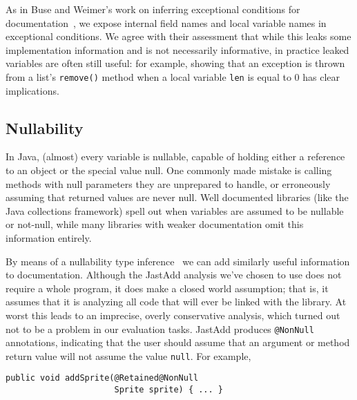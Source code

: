 As in Buse and Weimer's work on inferring exceptional conditions for
documentation~\cite{autodoc}, we expose internal field names and
local variable names in exceptional conditions.  We agree with their assessment
that while this leaks some
implementation information and is not necessarily informative, in practice
leaked variables are often still useful: for example, showing that an exception is
thrown from a list's \texttt{remove()} method when a local variable \texttt{len}
is equal to 0 has clear implications.

\subsection{Nullability}
\label{sec:Nullability}

In Java, (almost) every variable is nullable,
capable of holding either a reference to an object or the
special value null.  One commonly made mistake is calling
methods with null parameters they are unprepared to handle, or erroneously
assuming that returned values are never null.  Well documented libraries (like
the Java collections framework) spell out when variables are
assumed to be nullable or not-null, while many libraries with weaker
documentation omit this information entirely.

By means of a nullability type inference~\cite{NonNullTypeInference} we can add
similarly useful information to documentation.  Although the JastAdd analysis
we've chosen to use does not require a whole program, it does make a closed
world assumption; that is, it assumes that it is analyzing all code that will ever be
linked with the library.  At worst this leads to an imprecise, overly conservative analysis, which turned out not to be a problem in our evaluation tasks.  JastAdd produces \texttt{@NonNull} annotations, indicating that the user should assume that an
argument or method return value will not assume the value \texttt{null}.  For example,

\begin{verbatim}
public void addSprite(@Retained@NonNull
                      Sprite sprite) { ... }
\end{verbatim}
